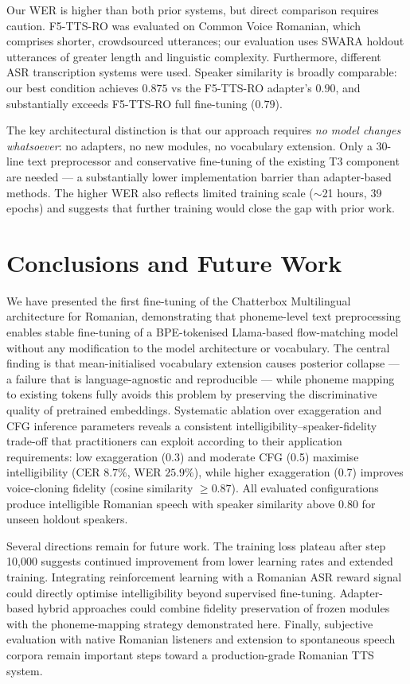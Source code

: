 \documentclass[conference]{IEEEtran}
\begin{document}
Our WER is higher than both prior systems, but direct comparison
requires caution.
F5-TTS-RO was evaluated on Common Voice Romanian, which comprises
shorter, crowdsourced utterances; our evaluation uses SWARA holdout
utterances of greater length and linguistic complexity.
Furthermore, different ASR transcription systems were used.
Speaker similarity is broadly comparable: our best condition
achieves $0.875$ vs the F5-TTS-RO adapter's $0.90$, and substantially
exceeds F5-TTS-RO full fine-tuning ($0.79$).

The key architectural distinction is that our approach requires
\emph{no model changes whatsoever}: no adapters, no new modules,
no vocabulary extension.
Only a 30-line text preprocessor and conservative fine-tuning of
the existing T3 component are needed — a substantially lower
implementation barrier than adapter-based methods.
The higher WER also reflects limited training scale ($\sim$21 hours,
39 epochs) and suggests that further training would close the gap
with prior work.

\section{Conclusions and Future Work}
\label{sec:conclusion}

We have presented the first fine-tuning of the Chatterbox Multilingual
architecture for Romanian, demonstrating that phoneme-level text
preprocessing enables stable fine-tuning of a BPE-tokenised
Llama-based flow-matching model without any modification to the model
architecture or vocabulary.
The central finding is that mean-initialised vocabulary extension
causes posterior collapse — a failure that is language-agnostic and
reproducible — while phoneme mapping to existing tokens fully avoids
this problem by preserving the discriminative quality of pretrained
embeddings.
Systematic ablation over exaggeration and CFG inference parameters
reveals a consistent intelligibility--speaker-fidelity trade-off
that practitioners can exploit according to their application
requirements: low exaggeration (0.3) and moderate CFG (0.5) maximise
intelligibility (CER $8.7\%$, WER $25.9\%$), while higher
exaggeration (0.7) improves voice-cloning fidelity (cosine
similarity $\geq 0.87$).
All evaluated configurations produce intelligible Romanian speech
with speaker similarity above $0.80$ for unseen holdout speakers.

Several directions remain for future work.
The training loss plateau after step 10,000 suggests continued
improvement from lower learning rates and extended training.
Integrating reinforcement learning with a Romanian ASR reward signal
could directly optimise intelligibility beyond supervised fine-tuning.
Adapter-based hybrid approaches could combine fidelity preservation
of frozen modules with the phoneme-mapping strategy demonstrated here.
Finally, subjective evaluation with native Romanian listeners and
extension to spontaneous speech corpora remain important steps toward
a production-grade Romanian TTS system.
\end{document}
